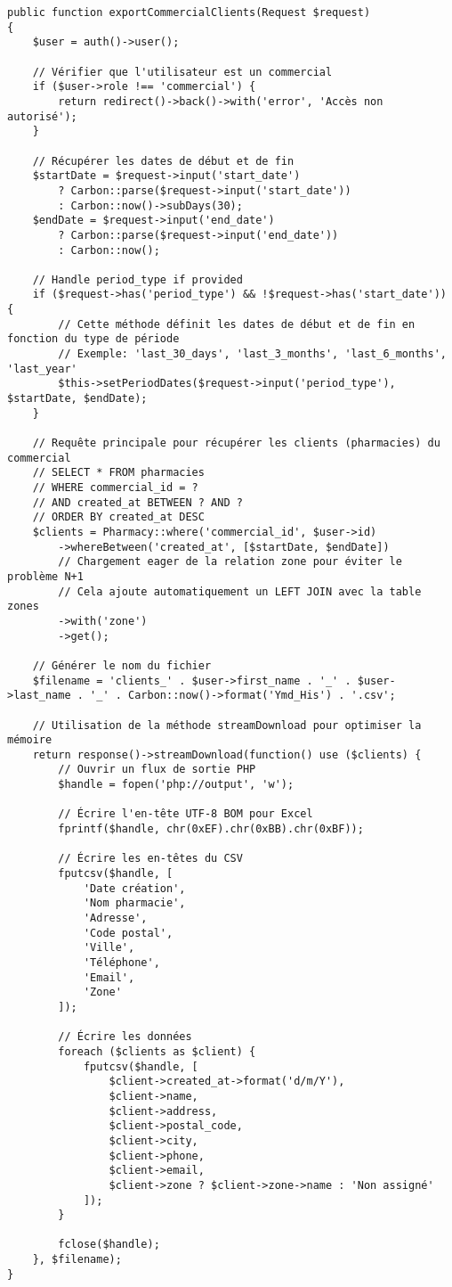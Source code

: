 \documentclass[12pt,a4paper]{article}
\begin{document}
\begin{lstlisting}[caption=Méthode exportCommercialClients]
public function exportCommercialClients(Request $request)
{
    $user = auth()->user();
    
    // Vérifier que l'utilisateur est un commercial
    if ($user->role !== 'commercial') {
        return redirect()->back()->with('error', 'Accès non autorisé');
    }
    
    // Récupérer les dates de début et de fin
    $startDate = $request->input('start_date') 
        ? Carbon::parse($request->input('start_date')) 
        : Carbon::now()->subDays(30);
    $endDate = $request->input('end_date') 
        ? Carbon::parse($request->input('end_date')) 
        : Carbon::now();
    
    // Handle period_type if provided
    if ($request->has('period_type') && !$request->has('start_date')) {
        // Cette méthode définit les dates de début et de fin en fonction du type de période
        // Exemple: 'last_30_days', 'last_3_months', 'last_6_months', 'last_year'
        $this->setPeriodDates($request->input('period_type'), $startDate, $endDate);
    }

    // Requête principale pour récupérer les clients (pharmacies) du commercial
    // SELECT * FROM pharmacies 
    // WHERE commercial_id = ? 
    // AND created_at BETWEEN ? AND ? 
    // ORDER BY created_at DESC
    $clients = Pharmacy::where('commercial_id', $user->id)
        ->whereBetween('created_at', [$startDate, $endDate])
        // Chargement eager de la relation zone pour éviter le problème N+1
        // Cela ajoute automatiquement un LEFT JOIN avec la table zones
        ->with('zone')
        ->get();
    
    // Générer le nom du fichier
    $filename = 'clients_' . $user->first_name . '_' . $user->last_name . '_' . Carbon::now()->format('Ymd_His') . '.csv';
    
    // Utilisation de la méthode streamDownload pour optimiser la mémoire
    return response()->streamDownload(function() use ($clients) {
        // Ouvrir un flux de sortie PHP
        $handle = fopen('php://output', 'w');
        
        // Écrire l'en-tête UTF-8 BOM pour Excel
        fprintf($handle, chr(0xEF).chr(0xBB).chr(0xBF));
        
        // Écrire les en-têtes du CSV
        fputcsv($handle, [
            'Date création',
            'Nom pharmacie',
            'Adresse',
            'Code postal',
            'Ville',
            'Téléphone',
            'Email',
            'Zone'
        ]);
        
        // Écrire les données
        foreach ($clients as $client) {
            fputcsv($handle, [
                $client->created_at->format('d/m/Y'),
                $client->name,
                $client->address,
                $client->postal_code,
                $client->city,
                $client->phone,
                $client->email,
                $client->zone ? $client->zone->name : 'Non assigné'
            ]);
        }
        
        fclose($handle);
    }, $filename);
}
\end{lstlisting}
\end{document}
